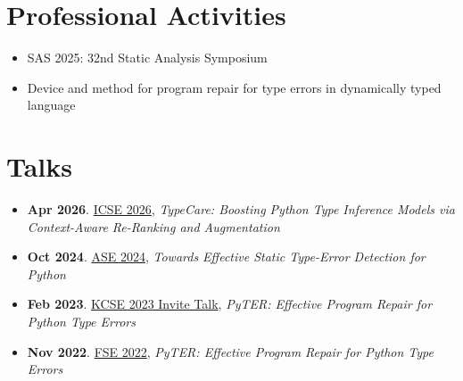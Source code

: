 \documentclass[10pt]{article} %
\begin{document}





\section{Professional Activities}

{
\begin{itemize}
    \item SAS 2025: 32nd Static Analysis Symposium
\end{itemize}
}

{
\begin{itemize}
    \item Device and method for program repair for type errors in dynamically typed language
\end{itemize}
}

\section{Talks}

\begin{itemize}
    \item \textbf{Apr 2026}. \href{https://conf.researchr.org/home/icse-2026}{ICSE 2026}, \textit{TypeCare: Boosting Python Type Inference Models via Context-Aware Re-Ranking and Augmentation}
    \item \textbf{Oct 2024}. \href{https://conf.researchr.org/home/ase-2024}{ASE 2024}, \textit{Towards Effective Static Type-Error Detection for Python}
    \item \textbf{Feb 2023}. \href{https://sigsoft.or.kr/kcse2023/}{KCSE 2023 Invite Talk}, \textit{PyTER: Effective Program Repair for Python Type Errors}
    \item \textbf{Nov 2022}. \href{https://2022.esec-fse.org}{FSE 2022}, \textit{PyTER: Effective Program Repair for Python Type Errors}
\end{itemize}
\end{document}
